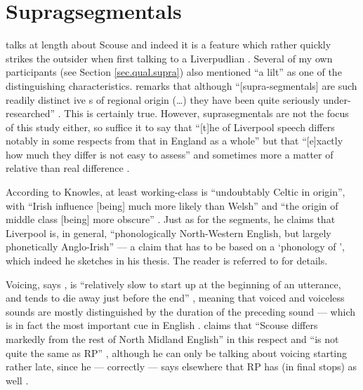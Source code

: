 	\section{Supragsegmentals}\label{sec.var.supra}

\citet{knowles1973} talks at length about Scouse  and indeed it is a feature which rather quickly strikes the outsider when first talking to a Liverpudlian .
Several of my own participants (see Section \ref{sec.qual.supra}) also mentioned ``a lilt'' as one of the distinguishing characteristics.
\citeauthor{wales2006} remarks that although ``[supra-segmentals] are such readily distinct ive s of regional origin (\ldots) they have been quite seriously under-researched'' \citeyearpar[201]{wales2006}.
This is certainly true.
However, suprasegmentals are not the focus of this study either, so suffice it to say that ``[t]he  of Liverpool speech differs notably in some respects from that in England as a whole'' but that ``[e]xactly how much they differ is not easy to assess'' \citep[221]{knowles1973} and sometimes more a matter of relative  than real difference \citep[cf.][176]{knowles1973}.

According to Knowles, at least working-class  is ``undoubtably Celtic in origin'', with ``Irish influence [being] much more likely than Welsh'' \citep[221--222]{knowles1973} and ``the origin of middle class   [being] more obscure'' \citep[222--223]{knowles1973}.
Just as for the segments, he claims that Liverpool  is, in general, ``phonologically North-Western English, but largely phonetically Anglo-Irish'' \citep[225]{knowles1973} --- a claim that has to be based on a `phonology of ', which indeed he sketches in his thesis.
The reader is referred to \citet[174--226]{knowles1973} for details.

Voicing, says \citeauthor{knowles1973}, is ``relatively slow to start up at the beginning of an utterance, and tends to die away just before the end'' \citeyearpar[246]{knowles1973}, meaning that voiced and voiceless sounds are mostly distinguished by the duration of the preceding sound --- which is in fact the most important cue in English \citep[cf., for instance,][]{hoganrozsypal1980}. \citeauthor{knowles1973} claims that ``Scouse differs markedly from the rest of North Midland English'' in this respect and ``is not quite the same as RP'' \citeyearpar[246]{knowles1973}, although he can only be talking about voicing starting rather late, since he --- correctly --- says elsewhere that RP has  (in final stops) as well \citeyearpar[cf.][114]{knowles1973}.

